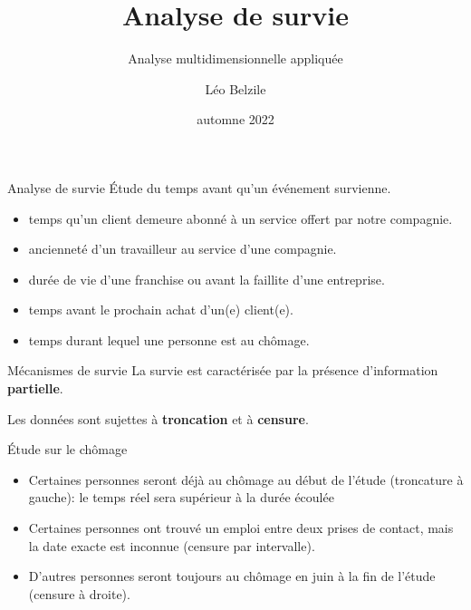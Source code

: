 \documentclass[
  ignorenonframetext,
]{beamer}
\title{Analyse de survie}
\subtitle{Analyse multidimensionnelle appliquée}
\author{Léo Belzile}
\date{automne 2022}
\institute{HEC Montréal}
\providecommand{\tightlist}{%
  \setlength{\itemsep}{0pt}\setlength{\parskip}{0pt}}\usepackage{longtable,booktabs,array}
\begin{document}
\frame{\titlepage}
\ifdefined\Shaded\renewenvironment{Shaded}{\begin{tcolorbox}[breakable, interior hidden, borderline west={3pt}{0pt}{shadecolor}, enhanced, sharp corners, boxrule=0pt, frame hidden]}{\end{tcolorbox}}\fi

\begin{frame}{Analyse de survie}
\protect\hypertarget{analyse-de-survie}{}
Étude du temps avant qu'un événement survienne.

\begin{itemize}
\tightlist
\item
  temps qu'un client demeure abonné à un service offert par notre
  compagnie.
\item
  ancienneté d'un travailleur au service d'une compagnie.
\item
  durée de vie d'une franchise ou avant la faillite d'une entreprise.
\item
  temps avant le prochain achat d'un(e) client(e).
\item
  temps durant lequel une personne est au chômage.
\end{itemize}
\end{frame}

\begin{frame}{Mécanismes de survie}
\protect\hypertarget{muxe9canismes-de-survie}{}
La survie est caractérisée par la présence d'information
\textbf{partielle}.

Les données sont sujettes à \textbf{troncation} et à \textbf{censure}.
\end{frame}

\begin{frame}{Étude sur le chômage}
\protect\hypertarget{uxe9tude-sur-le-chuxf4mage}{}
\begin{itemize}
\tightlist
\item
  Certaines personnes seront déjà au chômage au début de l'étude
  (troncature à gauche): le temps réel sera supérieur à la durée écoulée
\item
  Certaines personnes ont trouvé un emploi entre deux prises de contact,
  mais la date exacte est inconnue (censure par intervalle).
\item
  D'autres personnes seront toujours au chômage en juin à la fin de
  l'étude (censure à droite).
\end{itemize}
\end{frame}
\end{document}
